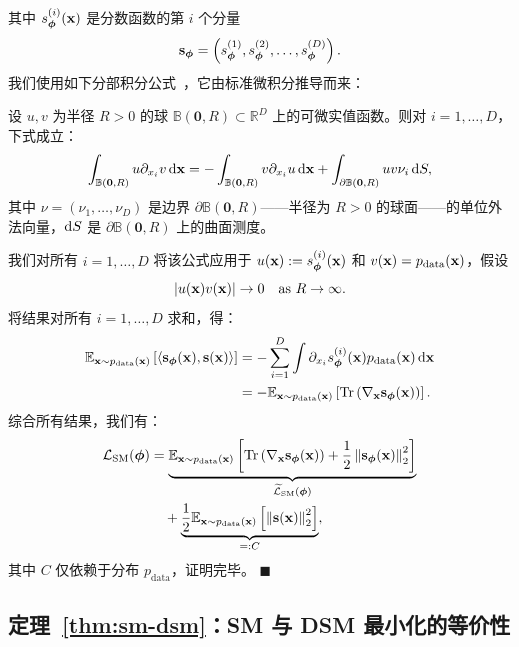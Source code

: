         其中 $s_{\bm{\phi}}^{(i)}({\mathbf{x}})$ 是分数函数的第 $i$ 个分量
        \[
        {\mathbf{s}}_{\bm{\phi}} = \left( s_{\bm{\phi}}^{(1)}, s_{\bm{\phi}}^{(2)}, \dots, s_{\bm{\phi}}^{(D)} \right).
        \]
        我们使用如下分部积分公式~\citep{evans10}，它由标准微积分推导而来：
        \begin{lemma*}
            设 $u, v$ 为半径 $R>0$ 的球 $\mathbb{B}(\bm{0}, R) \subset \mathbb{R}^D$ 上的可微实值函数。则对 $i = 1, \ldots, D$，下式成立：
        \[
        \int_{\mathbb{B}(\bm{0}, R)} u   \partial_{x_i} v   \mathop{}\!\mathrm{d} {\mathbf{x}} = -\int_{\mathbb{B}(\bm{0}, R)} v   \partial_{x_i} u   \mathop{}\!\mathrm{d} {\mathbf{x}} + \int_{\partial \mathbb{B}(\bm{0}, R)} u v \nu_i   \mathop{}\!\mathrm{d} S,
        \]
        其中 $\nu = (\nu_1, \ldots, \nu_D)$ 是边界 $\partial \mathbb{B}(\bm{0}, R)$——半径为 $R>0$ 的球面——的单位外法向量，$\mathop{}\!\mathrm{d} S$ 是 $\partial \mathbb{B}(\bm{0}, R)$ 上的曲面测度。
        \end{lemma*}
        我们对所有 $i = 1, \dots, D$ 将该公式应用于 $u({\mathbf{x}}) := s_{\bm{\phi}}^{(i)}({\mathbf{x}})$ 和 $v({\mathbf{x}}) = p_{\text{data}}({\mathbf{x}})$，假设
        \[
        |u({\mathbf{x}}) v({\mathbf{x}})| \to 0 \quad \text{as } R \to \infty.
        \]
        将结果对所有 $i = 1, \dots, D$ 求和，得：
        \begin{align*}
            \mathbb{E}_{{\mathbf{x}} \sim p_{\text{data}}({\mathbf{x}})} \left[ \langle {\mathbf{s}}_{\bm{\phi}}({\mathbf{x}}), {\mathbf{s}}({\mathbf{x}}) \rangle \right] 
             &= - \sum_{i=1}^{D} \int  \partial_{x_i}s_{\bm{\phi}}^{(i)}({\mathbf{x}}) p_{\text{data}}({\mathbf{x}}) \mathop{}\!\mathrm{d} {\mathbf{x}} \\
             &= - \mathbb{E}_{{\mathbf{x}} \sim p_{\text{data}}({\mathbf{x}})} \left[\operatorname{Tr}\left(\nabla_{{\mathbf{x}}}{\mathbf{s}}_{\bm{\phi}}({\mathbf{x}})\right) \right].
        \end{align*}
        综合所有结果，我们有：
        \begin{align*}
        \mathcal{L}_{\text{SM}}(\bm{\phi}) &= \underbrace{\mathbb{E}_{{\mathbf{x}} \sim p_{\text{data}}({\mathbf{x}})} \left[\operatorname{Tr}\left(\nabla_{{\mathbf{x}}}{\mathbf{s}}_{\bm{\phi}}({\mathbf{x}})\right) + \frac{1}{2}  \left\lVert{\mathbf{s}}_{\bm{\phi}}({\mathbf{x}})\right\rVert_2^2 \right]}_{\widetilde{\mathcal{L}}_{\text{SM}}(\bm{\phi})} \\
        &\quad + \underbrace{\frac{1}{2}\mathbb{E}_{{\mathbf{x}} \sim p_{\text{data}}({\mathbf{x}})} \left[ \left\lVert{\mathbf{s}}({\mathbf{x}})\right\rVert_2^2 \right]}_{=:C},
        \end{align*}
        其中 $C$ 仅依赖于分布 $p_{\text{data}}$，证明完毕。
\hfill$\blacksquare$

\subsection{定理~\ref{thm:sm-dsm}：SM 与 DSM 最小化的等价性}\label{app-sec:sm-dsm}
